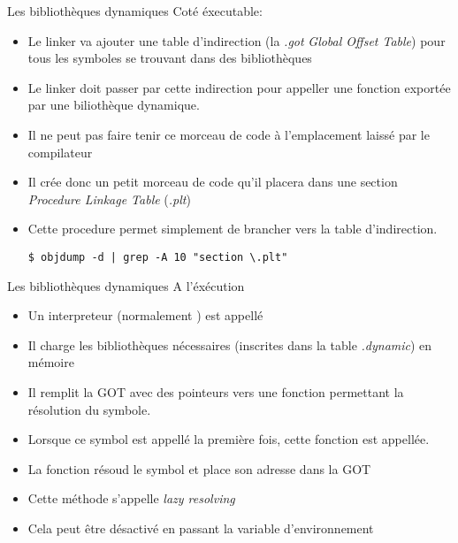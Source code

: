 \begin{frame}[fragile=singleslide]{Les bibliothèques dynamiques}
  Coté éxecutable:
  \begin{itemize}
  \item Le  linker va ajouter une table  d'indirection (la \emph{.got}
    \emph{Global  Offset Table})  pour tous  les symboles  se trouvant
    dans des bibliothèques
  \item Le linker doit passer  par cette indirection pour appeller une
    fonction exportée par une biliothèque dynamique.
  \item Il ne peut pas faire  tenir ce morceau de code à l'emplacement
    laissé par le compilateur
  \item Il crée  donc un petit morceau de code  qu'il placera dans une
    section \emph{Procedure Linkage Table} (\emph{.plt})
  \item Cette  procedure permet simplement  de brancher vers  la table
    d'indirection.
    \begin{lstlisting}
$ objdump -d | grep -A 10 "section \.plt"
    \end{lstlisting}
  \end{itemize}
\end{frame}

\begin{frame}[fragile=singleslide]{Les bibliothèques dynamiques}
  A l'éxécution
  \begin{itemize}
  \item Un interpreteur (normalement ) est appellé
  \item  Il charge  les bibliothèques  nécessaires (inscrites  dans la
    table \emph{.dynamic}) en mémoire
  \item  Il  remplit la  GOT  avec  des  pointeurs vers  une  fonction
    permettant la résolution du symbole.
  \item Lorsque ce symbol est appellé la première fois, cette fonction
    est appellée.
  \item La fonction résoud le symbol et place son adresse dans la GOT
  \item Cette méthode s'appelle \emph{lazy resolving}
  \item   Cela   peut   être   désactivé  en   passant   la   variable
    d'environnement 
  \end{itemize}
\end{frame}


